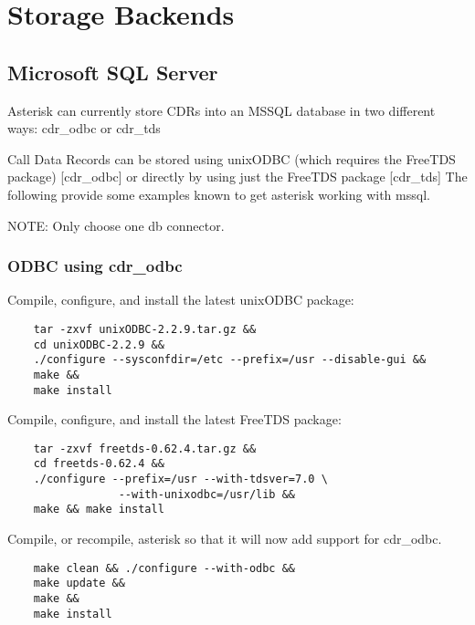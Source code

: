 \section{Storage Backends}

\subsection{Microsoft SQL Server}

	Asterisk can currently store CDRs into an MSSQL database in
	two different ways:  cdr_odbc or cdr_tds

	Call Data Records can be stored using unixODBC (which requires
	the FreeTDS package) [cdr_odbc] or directly by using just the
	FreeTDS package [cdr_tds]  The following provide some
	examples known to get asterisk working with mssql.

	NOTE:  Only choose one db connector.

\subsubsection{ODBC using cdr_odbc}
	Compile, configure, and install the latest unixODBC package:
\begin{astlisting}
\begin{verbatim}
	tar -zxvf unixODBC-2.2.9.tar.gz &&
	cd unixODBC-2.2.9 &&
	./configure --sysconfdir=/etc --prefix=/usr --disable-gui &&
	make &&
	make install
\end{verbatim}
\end{astlisting}

	Compile, configure, and install the latest FreeTDS package:
\begin{astlisting}
\begin{verbatim}
	tar -zxvf freetds-0.62.4.tar.gz &&
	cd freetds-0.62.4 &&
	./configure --prefix=/usr --with-tdsver=7.0 \
                 --with-unixodbc=/usr/lib &&
	make && make install
\end{verbatim}
\end{astlisting}

	Compile, or recompile, asterisk so that it will now add support
	for cdr_odbc.
\begin{astlisting}
\begin{verbatim}
	make clean && ./configure --with-odbc &&
	make update &&
	make &&
	make install
\end{verbatim}
\end{astlisting}

